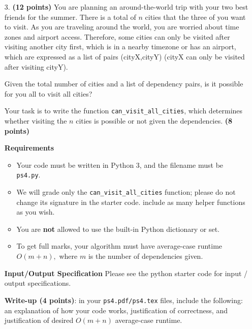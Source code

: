 \documentclass{assignment-263}
\begin{document}
\begin{enumerate}
\item[3.] \textbf{(12 points)}
  You are planning an around-the-world trip with your two best friends for the summer. 
There is a total of $n$ cities that the three of you want to visit.
As you are traveling around the world, you are worried about time zones and airport access. Therefore, some cities can only be visited after visiting another city first, which is in a nearby timezone or has an airport, which are expressed as a list of pairs (cityX,cityY) (cityX can only be visited after visiting cityY).

Given the total number of cities and a list of dependency pairs, is it possible for you all to visit all cities?

Your task is to write the function \verb|can_visit_all_cities|, which determines whether visiting the $n$ cities is possible or not given the dependencies. \textbf{(8 points)}

\textbf{Requirements}
\begin{itemize}
\item Your code must be written in Python 3, and the filename must be \verb|ps4.py|.
\item We will grade only the \verb|can_visit_all_cities| function; please do not change its signature in the starter code. include as many helper functions as you wish.
\item You are {\bf not} allowed to use the built-in Python dictionary or set.
\item To get full marks, your algorithm must have average-case runtime
  ${O}(m + n),$ where $m$ is the number of dependencies given.
\end{itemize}

\textbf{Input/Output Specification}
Please see the python starter code for input / output
specifications. 

\textbf{Write-up (4 points)}: in your \verb|ps4.pdf/ps4.tex| files,
include the following: an explanation of how your code works,
justification of correctness, and justification of desired
${O}(m + n)$ average-case runtime.

\end{enumerate}
\end{document}
